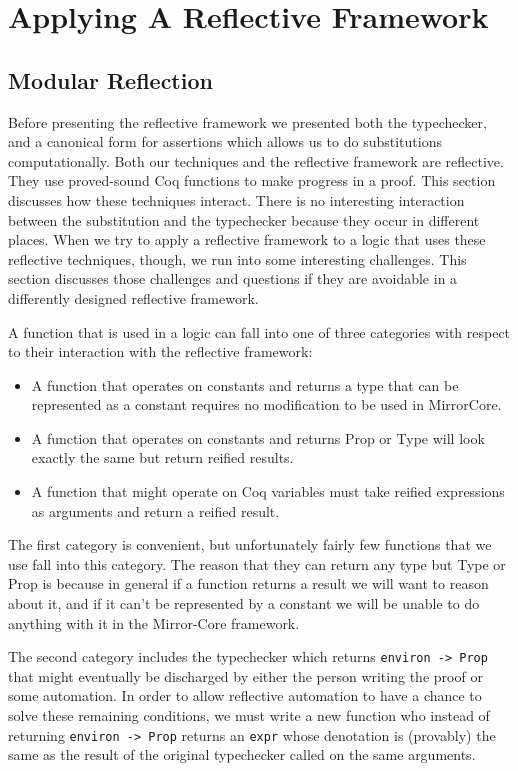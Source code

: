 \documentclass{puthesis}
\begin{document}
\chapter{Applying A Reflective Framework}

\section{Modular Reflection}

Before presenting the reflective framework we presented both the
typechecker, and a canonical form for assertions which allows us to do
substitutions computationally.  Both our techniques and the reflective
framework are reflective.  They use proved-sound Coq functions to make
progress in a proof. This section discusses how these techniques
interact. There is no interesting interaction between the substitution
and the typechecker because they occur in different places. When we
try to apply a reflective framework to a logic that uses these
reflective techniques, though, we run into some interesting
challenges. This section discusses those challenges and questions if
they are avoidable in a differently designed reflective framework.

A function that is used in a logic can fall into one of three
categories with respect to their interaction with the reflective
framework:

\begin{itemize}
\item A function that operates on constants and returns a type that
  can be represented as a constant requires no modification to be used
  in MirrorCore.
\item A function that operates on constants and returns Prop or Type
  will look exactly the same but return reified results.
\item A function that might operate on Coq variables must take reified
  expressions as arguments and return a reified result.
\end{itemize}

The first category is convenient, but unfortunately fairly few
functions that we use fall into this category. The reason that they
can return any type but Type or Prop is because in general if a
function returns a result we will want to reason about it, and if it
can't be represented by a constant we will be unable to do anything
with it in the Mirror-Core framework.

The second category includes the typechecker which returns
\lstinline|environ -> Prop| that might eventually be discharged by
either the person writing the proof or some automation.  In order to
allow reflective automation to have a chance to solve these remaining
conditions, we must write a new function who instead of returning
\lstinline|environ -> Prop| returns an \lstinline|expr| whose
denotation is (provably) the same as the result of the original
typechecker called on the same arguments.
\end{document}
